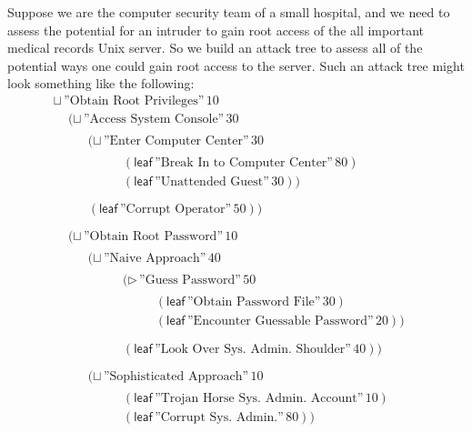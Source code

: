 \documentclass{sigplanconf}
\begin{document}
Suppose we are the computer security team of a small hospital, and we
need to assess the potential for an intruder to gain root access of the
all important medical records Unix server.  So we build an attack tree
to assess all of the potential ways one could gain root access to the
server.  Such an attack tree might look something like the following:
\[
  \begin{array}{lll}
    \sqcup\,\text{''Obtain Root Privileges''}\,10\\
    \,\,\,\,\,\,\,(\sqcup\,\text{''Access System Console''}\,30\\
    \,\,\,\,\,\,\,\,\,\,\,\,\,\,\begin{array}{lll}
    (\sqcup\,\text{''Enter Computer Center''}\,30\\
    \,\,\,\,\,\,\,\,\,\,\,\,\,\,\begin{array}{lll}
    (\mathsf{leaf}\,\text{''Break In to Computer Center''}\,80)\\
    (\mathsf{leaf}\,\text{''Unattended Guest''}\,30))\\
    \end{array}\\
    (\mathsf{leaf}\,\text{''Corrupt Operator''}\,50))\\
    \end{array}\\
    \,\,\,\,\,\,\,(\sqcup\,\text{''Obtain Root Password''}\,10\\
    \,\,\,\,\,\,\,\,\,\,\,\,\,\,\begin{array}{lll}
    (\sqcup\,\text{''Naive Approach''}\,40\\
    \,\,\,\,\,\,\,\,\,\,\,\,\,\,\begin{array}{lll}
    (\rhd\,\text{''Guess Password''}\,50\\
    \,\,\,\,\,\,\,\,\,\,\,\,\,\begin{array}{lll}
    (\mathsf{leaf}\,\text{''Obtain Password File''}\,30)\\
    (\mathsf{leaf}\,\text{''Encounter Guessable Password''}\,20))\\
    \end{array}\\
    (\mathsf{leaf}\,\text{''Look Over Sys. Admin. Shoulder''}\,40))\\
    \end{array}\\
    (\sqcup\,\text{''Sophisticated Approach''}\,10\\
    \,\,\,\,\,\,\,\,\,\,\,\,\,\,\begin{array}{lll}
    (\mathsf{leaf}\,\text{''Trojan Horse Sys. Admin. Account''}\,10)\\
    (\mathsf{leaf}\,\text{''Corrupt Sys. Admin.''}\,80))\\
    \end{array}
    \end{array}
  \end{array}
\]
\end{document}
